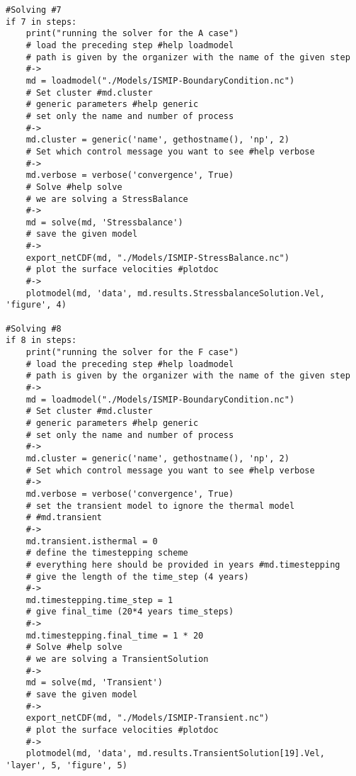 \begin{verbatim}
#Solving #7
if 7 in steps:
    print("running the solver for the A case")
    # load the preceding step #help loadmodel
    # path is given by the organizer with the name of the given step
    #->
    md = loadmodel("./Models/ISMIP-BoundaryCondition.nc")
    # Set cluster #md.cluster
    # generic parameters #help generic
    # set only the name and number of process
    #->
    md.cluster = generic('name', gethostname(), 'np', 2)
    # Set which control message you want to see #help verbose
    #->
    md.verbose = verbose('convergence', True)
    # Solve #help solve
    # we are solving a StressBalance
    #->
    md = solve(md, 'Stressbalance')
    # save the given model
    #->
    export_netCDF(md, "./Models/ISMIP-StressBalance.nc")
    # plot the surface velocities #plotdoc
    #->
    plotmodel(md, 'data', md.results.StressbalanceSolution.Vel, 'figure', 4)

#Solving #8
if 8 in steps:
    print("running the solver for the F case")
    # load the preceding step #help loadmodel
    # path is given by the organizer with the name of the given step
    #->
    md = loadmodel("./Models/ISMIP-BoundaryCondition.nc")
    # Set cluster #md.cluster
    # generic parameters #help generic
    # set only the name and number of process
    #->
    md.cluster = generic('name', gethostname(), 'np', 2)
    # Set which control message you want to see #help verbose
    #->
    md.verbose = verbose('convergence', True)
    # set the transient model to ignore the thermal model
    # #md.transient
    #->
    md.transient.isthermal = 0
    # define the timestepping scheme
    # everything here should be provided in years #md.timestepping
    # give the length of the time_step (4 years)
    #->
    md.timestepping.time_step = 1
    # give final_time (20*4 years time_steps)
    #->
    md.timestepping.final_time = 1 * 20
    # Solve #help solve
    # we are solving a TransientSolution
    #->
    md = solve(md, 'Transient')
    # save the given model
    #->
    export_netCDF(md, "./Models/ISMIP-Transient.nc")
    # plot the surface velocities #plotdoc
    #->
    plotmodel(md, 'data', md.results.TransientSolution[19].Vel, 'layer', 5, 'figure', 5)
\end{verbatim}
